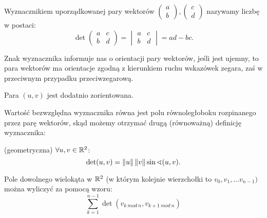\begin{df}
Wyznacznikiem uporządkowanej pary wektorów $\begin{pmatrix}a \\ b\end{pmatrix}
,\begin{pmatrix} c \\ d \end{pmatrix} $ nazywamy liczbę w postaci: $$\det\begin{pmatrix} a & c \\ b & d\end{pmatrix}=
\begin{vmatrix} a & c \\ b & d \end{vmatrix} = ad - bc.$$
\end{df}
    
Znak wyznacznika informuje nas o orientacji pary wektorów, jeśli jest ujemny, to para wektorów ma orientacje zgodną z
kierunkiem ruchu wskazówek zegara, zaś w przeciwnym przypadku przeciwzegarową.

\begin{center}
    \end{center}
\begin{prz}
Para $(u,v)$ jest dodatnio zorientowana.
\end{prz}
    
Wartość bezwzględna wyznacznika równa jest polu równoległoboku rozpinanego przez parę wektorów, skąd możemy otrzymać drugą (równoważną) definicję wyznacznika:

\begin{df}(geometryczna) $\forall u,v\in\mathbb{R}^2$: $$\det(u,v) = \left\lVert u\right\rVert\left\lVert v\right\rVert\sin\sphericalangle(u,v).$$ \end{df}
    
\begin{ft}
    Pole dowolnego wielokąta w $\mathbb{R}^2$ (w którym kolejnie wierzchołki to $v_0,v_1, \dots v_{n-1})$ można wyliczyć za
    pomocą wzoru: 
    \[ \sum_{k=1}^{n-1} \det(v_{k \ mod \ n},v_{k+1 \ mod \ n}) \]
\end{ft}

